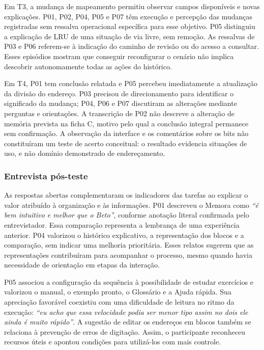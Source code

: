 Em T3, a mudança de mapeamento permitiu observar campos disponíveis e novas explicações. P01, P02, P04, P05 e P07 têm execução e percepção das mudanças registradas sem ressalva operacional específica para esse objetivo. P05 distinguiu a explicação de LRU de uma situação de via livre, sem remoção. As ressalvas de P03 e P06 referem-se à indicação do caminho de revisão ou do acesso a consultar. Esses episódios mostram que conseguir reconfigurar o cenário não implica descobrir autonomamente todas as ações do histórico.

Em T4, P01 tem conclusão relatada e P05 percebeu imediatamente a atualização da divisão do endereço. P03 precisou de direcionamento para identificar o significado da mudança; P04, P06 e P07 discutiram as alterações mediante perguntas e orientações. A transcrição de P02 não descreve a alteração de memória prevista na ficha C, motivo pelo qual a conclusão integral permanece sem confirmação. A observação da interface e os comentários sobre os bits não constituíram um teste de acerto conceitual: o resultado evidencia situações de uso, e não domínio demonstrado de endereçamento.

\subsubsection{Entrevista pós-teste}

As respostas abertas complementaram os indicadores das tarefas ao explicar o valor atribuído à organização e às informações. P01 descreveu o Memora como \textit{``é bem intuitivo e melhor que o Beto''}, conforme anotação literal confirmada pelo entrevistador. Essa comparação representa a lembrança de uma experiência anterior. P04 valorizou o histórico explicativo, a representação dos blocos e a comparação, sem indicar uma melhoria prioritária. Esses relatos sugerem que as representações contribuíram para acompanhar o processo, mesmo quando havia necessidade de orientação em etapas da interação.

P05 associou a configuração da sequência à possibilidade de estudar exercícios e valorizou o manual, o exemplo pronto, o Glossário e a Ajuda rápida. Sua apreciação favorável coexistiu com uma dificuldade de leitura no ritmo da execução: \textit{``eu acho que essa velocidade podia ser menor tipo assim no dois ele ainda é muito rápido''}. A sugestão de editar os endereços em blocos também se relaciona à prevenção de erros de digitação. Assim, o participante reconheceu recursos úteis e apontou condições para utilizá-los com mais controle.

